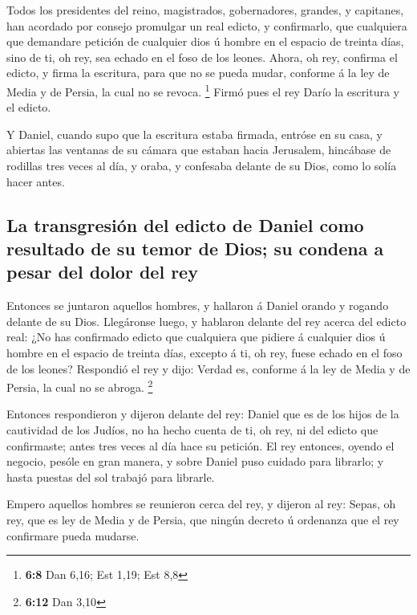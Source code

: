  Todos los presidentes del reino, magistrados, gobernadores,
grandes, y capitanes, han acordado por consejo promulgar un real edicto,
y confirmarlo, que cualquiera que demandare petición de cualquier dios ú
hombre en el espacio de treinta días, sino de ti, oh rey, sea echado en
el foso de los leones.  Ahora, oh rey, confirma el edicto, y
firma la escritura, para que no se pueda mudar, conforme á la ley de
Media y de Persia, la cual no se revoca. \footnote{\textbf{6:8} Dan
  6,16; Est 1,19; Est 8,8}  Firmó pues el rey Darío la
escritura y el edicto.

 Y Daniel, cuando supo que la escritura estaba firmada,
entróse en su casa, y abiertas las ventanas de su cámara que estaban
hacia Jerusalem, hincábase de rodillas tres veces al día, y oraba, y
confesaba delante de su Dios, como lo solía hacer antes.

\hypertarget{la-transgresiuxf3n-del-edicto-de-daniel-como-resultado-de-su-temor-de-dios-su-condena-a-pesar-del-dolor-del-rey}{%
\subsection{La transgresión del edicto de Daniel como resultado de su
temor de Dios; su condena a pesar del dolor del
rey}\label{la-transgresiuxf3n-del-edicto-de-daniel-como-resultado-de-su-temor-de-dios-su-condena-a-pesar-del-dolor-del-rey}}

 Entonces se juntaron aquellos hombres, y hallaron á Daniel
orando y rogando delante de su Dios.  Llegáronse luego, y
hablaron delante del rey acerca del edicto real: ¿No has confirmado
edicto que cualquiera que pidiere á cualquier dios ú hombre en el
espacio de treinta días, excepto á ti, oh rey, fuese echado en el foso
de los leones? Respondió el rey y dijo: Verdad es, conforme á la ley de
Media y de Persia, la cual no se abroga. \footnote{\textbf{6:12} Dan
  3,10}

 Entonces respondieron y dijeron delante del rey: Daniel
que es de los hijos de la cautividad de los Judíos, no ha hecho cuenta
de ti, oh rey, ni del edicto que confirmaste; antes tres veces al día
hace su petición.  El rey entonces, oyendo el negocio,
pesóle en gran manera, y sobre Daniel puso cuidado para librarlo; y
hasta puestas del sol trabajó para librarle.

 Empero aquellos hombres se reunieron cerca del rey, y
dijeron al rey: Sepas, oh rey, que es ley de Media y de Persia, que
ningún decreto ú ordenanza que el rey confirmare pueda mudarse.

